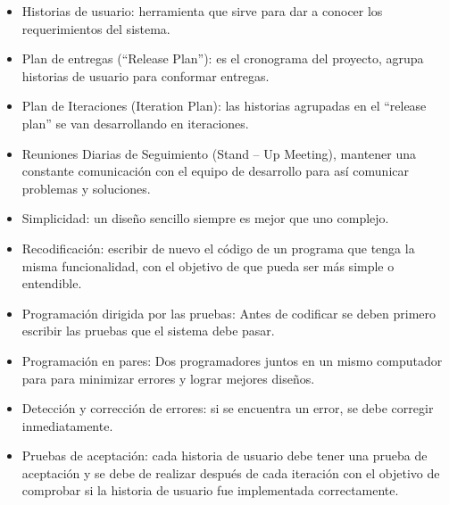 \begin{itemize}

\item Historias de usuario: herramienta que sirve para dar a conocer los requerimientos del sistema.

\item Plan de entregas (“Release Plan”): es el cronograma del proyecto, agrupa historias de usuario para conformar entregas.

\item Plan de Iteraciones (Iteration Plan): las historias agrupadas en el “release plan” se van desarrollando en iteraciones. 

\item Reuniones Diarias de Seguimiento (Stand – Up Meeting), mantener una constante comunicación con el equipo de desarrollo para así comunicar problemas y soluciones.

\item Simplicidad: un diseño sencillo siempre es mejor que uno complejo. 

\item Recodificación: escribir de nuevo el código de un programa que tenga la misma funcionalidad, con el objetivo de que pueda ser más simple o entendible.

\item Programación dirigida por las pruebas: Antes de codificar se deben primero escribir las pruebas que el sistema debe pasar.

\item Programación en pares: Dos programadores juntos en un mismo computador para para minimizar errores y lograr mejores diseños.

\item Detección y corrección de errores: si se encuentra un error, se debe corregir inmediatamente.

\item  Pruebas de aceptación: cada historia de usuario debe tener una prueba de aceptación y se debe de realizar después de cada iteración con el objetivo de comprobar si la historia de usuario fue implementada correctamente.
\end{itemize}

